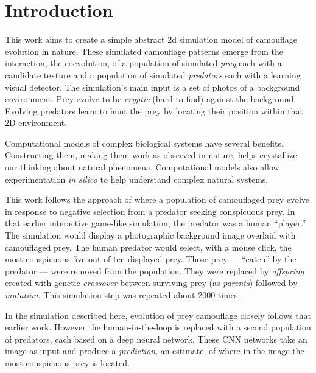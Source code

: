 \documentclass[acmtog,
    anonymous,
    review
    ]{acmart}
\newcommand{\jargon}[1]{\textit{#1}}
\begin{document}
\section{Introduction}
This work aims to create a simple abstract 2d simulation model of camouflage evolution in nature. These simulated camouflage patterns emerge from the interaction, the coevolution, of a population of simulated \jargon{prey} each with a candidate texture and a population of simulated \jargon{predators} each with a learning visual detector. The simulation's main input is a set of photos of a background environment. Prey evolve to be \jargon{cryptic} (hard to find) against the background. Evolving predators learn to hunt the prey by locating their position within that 2D environment.
\par
Computational models of complex biological systems have several benefits. Constructing them, making them work as observed in nature, helps crystallize our thinking about natural phenomena. Computational models also allow experimentation \textit{in silico} to help understand complex natural systems.
\par
This work follows the approach of \citet{reynolds_iec_2011} where a population of camouflaged prey evolve in response to negative selection from a predator seeking conspicuous prey. In that earlier interactive game-like simulation, the predator was a human “player.” The simulation would display a photographic background image overlaid with camouflaged prey. The human predator would select, with a mouse click, the most conspicuous five out of ten displayed prey. Those prey — “eaten” by the predator — were removed from the population.  They were replaced by \jargon{offspring} created with genetic \jargon{crossover} between surviving prey (as \jargon{parents}) followed by \jargon{mutation}. This simulation step was repeated about 2000 times.
\par
In the simulation described here, evolution of prey camouflage closely follows that earlier work. However the human-in-the-loop is replaced with a second population of predators, each based on a deep neural network. These CNN networks take an image as input and produce a \jargon{prediction}, an estimate, of where in the image the most conspicuous prey is located.
\par
\end{document}
